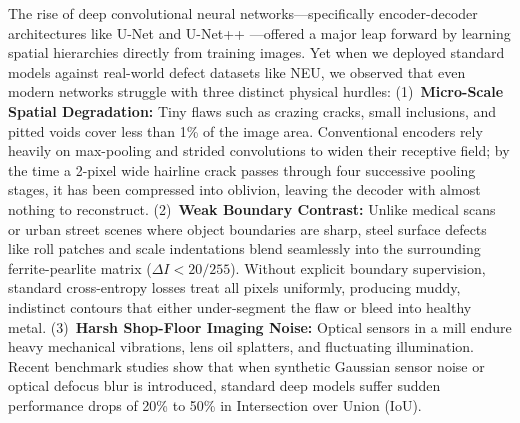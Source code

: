 \documentclass[10pt,a4paper]{article}
\begin{document}
The rise of deep convolutional neural networks---specifically encoder-decoder architectures like U-Net \cite{unet2015} and U-Net++ \cite{unetpp2018}---offered a major leap forward by learning spatial hierarchies directly from training images. Yet when we deployed standard models against real-world defect datasets like NEU, we observed that even modern networks struggle with three distinct physical hurdles:
(1)~\textbf{Micro-Scale Spatial Degradation:} Tiny flaws such as crazing cracks, small inclusions, and pitted voids cover less than 1\% of the image area. Conventional encoders rely heavily on max-pooling and strided convolutions to widen their receptive field; by the time a 2-pixel wide hairline crack passes through four successive pooling stages, it has been compressed into oblivion, leaving the decoder with almost nothing to reconstruct.
(2)~\textbf{Weak Boundary Contrast:} Unlike medical scans or urban street scenes where object boundaries are sharp, steel surface defects like roll patches and scale indentations blend seamlessly into the surrounding ferrite-pearlite matrix ($\Delta I < 20/255$). Without explicit boundary supervision, standard cross-entropy losses treat all pixels uniformly, producing muddy, indistinct contours that either under-segment the flaw or bleed into healthy metal.
(3)~\textbf{Harsh Shop-Floor Imaging Noise:} Optical sensors in a mill endure heavy mechanical vibrations, lens oil splatters, and fluctuating illumination. Recent benchmark studies \cite{neu_robustness2025, ispad2025} show that when synthetic Gaussian sensor noise or optical defocus blur is introduced, standard deep models suffer sudden performance drops of 20\% to 50\% in Intersection over Union (IoU).
\end{document}
